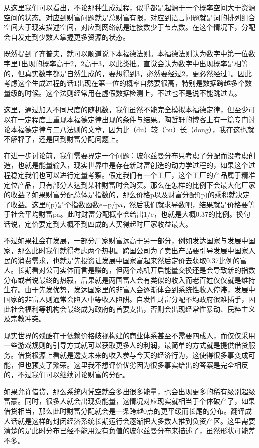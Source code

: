 \documentclass[]{book}
\begin{document}
从这里我们可以看出，不论那种生成过程，似乎都是起源于一个概率空间大于资源空间的状态。对应到财富问题就是总财富有限，对应到语言问题就是词的排列组合空间大于现实描述空间，对应到网络就是连接数少于节点数。在这个情况下，分配会自发走到少数人掌握更多资源的状态。

既然提到了齐普夫，就可以顺道说下本福德法则。本福德法则认为数字中第一位数字里1出现的概率高于2，2高于3，以此类推。直觉会认为数字中出现概率是相等的，但真实数字都是自然生成的，要想得到3，必然要经过2，更必然经过1。因此考虑这个生成过程的话1出现在第一位的概率自然要很高，特别是数据跨越多个数量级的时候。这个法则经常用在虚假数据检测上，不过也不是说不能跳过去。

这里，通过加入不同尺度的随机数，我们虽然不能完全模拟本福德定律，但至少可以在一定程度上重现本福德定律出现的条件与结果。陶哲轩的博客上有一篇专门讨论本福德定律与二八法则的文章，因为比（du）较（bu）长（dong），我在这也就不解释了，还是回到财富分配问题上。

在进一步讨论前，我们需要界定一个问题：玻尔兹曼分布只考虑了分配而没考虑创造，也就是能量输入，现实世界中是存在新财富创造的动力学过程的，如果这个过程稳定我们也可以进行定量考察。假定我们有一个工厂，这个工厂的产品属于精准定位产品，只有部分人达到某种财富时会购买。那么在怎样的比例下会最大化厂家的收益？如果财富分配总体是指数的，那么价格p以及财富分配f(p)的乘积就决定了收益。这里f(p)是个指数函数e−p/pa，然后我们就求导数吧，结果就是价格要等于社会平均财富pa。此时财富分配概率会给出1/e，也就是大概0.37的比例。换句话说，定价要定到大概不到四成的人买得起时厂家收益最大。

不过如果社会在发展，一部分厂家财富远高于另一部分，例如发达国家与发展中国家，那么此时我们就得考虑两个热机。跨国公司为了卖出产品要引导发展中国家人民的消费需求，也就是先投资让发展中国家富起来然后定价去获取0.37比例的富人。长期看对公司实体而言是赚的，但两个热机开启能量交换还是会导致新的指数分布或者说最终的热寂，后果就是两国富人会有类似的收入而老百姓仅仅就是维持生存。由于先发优势，发达国家里的非富人会逐渐体会到系统性收入停滞，发展中国家的非富人则通常会陷入中等收入陷阱。自发性财富分配不均政府很难插手，因此社会福利等机构会最终成为政府的首要支出，否则会出现经常性暴动、民粹主义及宗教冲突。

现实世界的残酷在于依赖价格歧视构建的商业体系甚至不需要四成人，而仅仅采用一些游戏规则的引导方式就可以获取更多人的利润，最简单的方式就是提供借贷服务。借贷根源上看就是透支未来的收入参与今天的经济行为，这使得很多事变成可能，但也预支了繁荣。这里我不想评价优劣因为很多事实给出的答案是完全相反的，不过我们可以继续讨论财富的分配。

如果允许借贷，那么系统内凭空就会多出很多能量，也会出现更多的稀有级别超级富豪。同时，很多人就会出现负能量，这情况对应现实就相当于个体破产了，如果借贷相当，那么此时财富分配就会是一条跨越0点的更平缓而长尾的分布。翻译成人话就是这样的封闭经济系统长期运行会逐渐把大多数人推到负资产区。这里需要清楚的是此时分布已经不能用没有负值的玻尔兹曼分布来描述了，虽然形状可能差不多。
\end{document}
